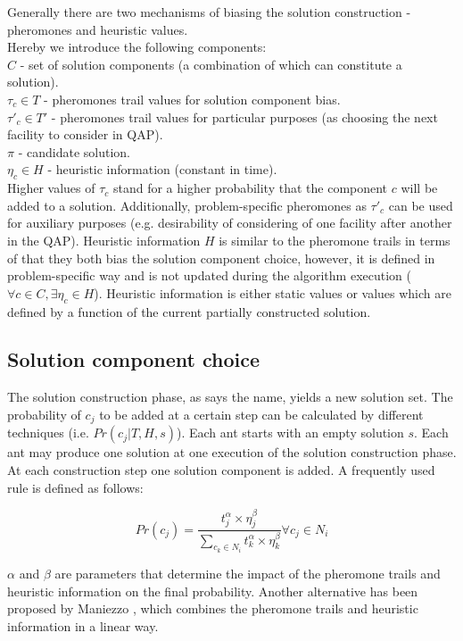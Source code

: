Generally there are two mechanisms of biasing the solution construction - pheromones and heuristic values. \\
Hereby we introduce the following components: \\
$C$ - set of solution components (a combination of which can constitute a solution). \\
$\tau_c \in T$ - pheromones trail values for solution component bias. \\
$\tau'_c \in T'$ - pheromones trail values for particular purposes (as choosing the next facility to consider in QAP). \\
$\pi$ - candidate solution. \\
$\eta_c \in H$ - heuristic information (constant in time). \\

Higher values of $\tau_c$ stand for a higher probability that the component $c$ will be added to a solution. Additionally, problem-specific pheromones as $\tau'_c$ can be used for auxiliary purposes (e.g. desirability of considering of one facility after another in the QAP). Heuristic information $H$ is similar to the pheromone trails in terms of that they both bias the solution component choice, however, it is defined in problem-specific way and is not updated during the algorithm execution ($\forall c \in C, \exists \eta_c \in H$). Heuristic information is either static values or values which are defined by a function of the current partially constructed solution. 

\subsection{Solution component choice}

The solution construction phase, as says the name, yields a new solution set. The probability of $c_j$ to be added at a certain step can be calculated by different techniques (i.e. $Pr(c_j|T,H,s)$). Each ant starts with an empty solution $s$. Each ant may produce one solution at one execution of the solution construction phase. At each construction step one solution component is added. A frequently used rule is defined as follows:

\begin{equation}
Pr(c_j)=\frac{t_j^\alpha \times \eta_j^\beta}{\sum \limits_{c_k \in N_i} t_k^\alpha \times \eta_k^\beta} \forall c_j \in N_i
\label{eq:construction_classic}
\end{equation}

$\alpha$ and $\beta$ are parameters that determine the impact of the pheromone trails and heuristic information on the final probability. Another alternative has been proposed by Maniezzo \cite{maniezzo}, which combines the pheromone trails and heuristic information in a linear way.


